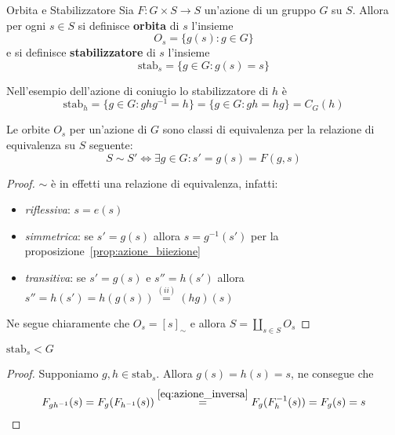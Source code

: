 \begin{definition}{Orbita e Stabilizzatore}
    Sia \(F : G \times  S \to S\) un'azione di un gruppo \(G\) su \(S\). Allora
    per ogni \(s \in S\) si definisce \textbf{orbita} di \(s\) l'insieme
    \[
        O_s = \{g{(s)} : g \in G\}
    \]
    e si definisce \textbf{stabilizzatore} di \(s\) l'insieme
    \[
        \mathrm{stab}_s = \{g \in G : g{(s)} = s\}
    \]
\end{definition}
\begin{example}
    Nell'esempio dell'azione di coniugio lo stabilizzatore di \(h\) è
    \[
        \mathrm{stab}_h = \{g \in G : ghg^{-1} = h\} = \{g \in G : gh = hg\} =
        C_G{(h)}
    \]
\end{example}

\begin{proposition}

Le orbite \(O_s\) per un'azione di \(G\) sono classi di equivalenza per la
relazione di equivalenza su \(S\) seguente:
\[
  S \sim S' \iff \exists g \in G : s' = g{(s)} = F{(g, s)}
\]
\end{proposition}
\begin{proof}
\(\sim\) è in effetti una relazione di equivalenza, infatti:
\begin{itemize}[label = --]
    \item \emph{riflessiva}: \(s = e{(s)}\)
    \item \emph{simmetrica}: se \(s' = g{(s)}\) allora \(s = g^{-1}{(s')}\)
        per la proposizione~\ref{prop:azione_biiezione}
    \item \emph{transitiva}: se \(s' = g{(s)}\) e \(s'' = h{(s')}\) allora
        \(s'' = h{(s')} = h{(g{(s)})} \overset{(ii)}{=} {(hg)}{(s)}\)
\end{itemize}

Ne segue chiaramente che \(O_s = {[s]}_\sim \) e allora \(\displaystyle S = \coprod_{s \in S}
O_s\) 
\end{proof}
\begin{proposition}
    \(\mathrm{stab}_s < G\) 
\end{proposition}
\begin{proof}
    Supponiamo \(g, h \in \mathrm{stab}_s\). Allora \(g{(s)} = h{(s)} = s\), ne
    consegue che
    \[
        F_{gh^{-1}} {(s)} = F_{g} {(F_{h^{-1}} {(s)})}
        \overset{\eqref{eq:azione_inversa}}{=} F_g {(F^{-1}_h{(s)})} =
        F_g {(s)} = s
    \]
\end{proof}

